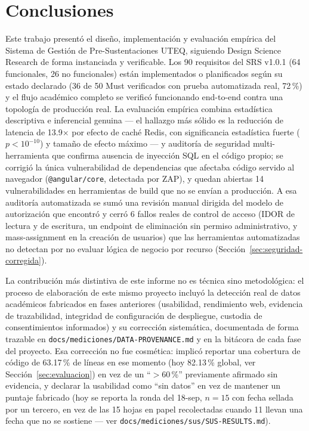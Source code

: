 \section{Conclusiones}
\label{sec:conclusiones}

Este trabajo presentó el diseño, implementación y evaluación empírica del Sistema de Gestión de
Pre-Sustentaciones UTEQ, siguiendo Design Science Research \cite{peffers2007} de forma instanciada y
verificable. Los 90 requisitos del SRS v1.0.1 (64 funcionales, 26 no funcionales) están implementados o planificados
según su estado declarado (36 de 50 Must verificados con prueba automatizada real, 72\,\%) y el flujo
académico completo se verificó funcionando end-to-end contra una topología de producción real. La evaluación empírica combina
estadística descriptiva e inferencial genuina --- el hallazgo más sólido es la reducción de latencia de
13.9$\times$ por efecto de caché Redis, con significancia estadística fuerte ($p < 10^{-10}$) y tamaño
de efecto máximo --- y auditoría de seguridad multi-herramienta que confirma ausencia de inyección SQL en
el código propio; se corrigió la única vulnerabilidad de dependencias que afectaba código servido al
navegador (\texttt{@angular/core}, detectada por ZAP), y quedan abiertas 14 vulnerabilidades en
herramientas de build que no se envían a producción. A esa auditoría automatizada se sumó una revisión
manual dirigida del modelo de autorización que encontró y cerró 6 fallos reales de control de acceso
(IDOR de lectura y de escritura, un endpoint de eliminación sin permiso administrativo, y
mass-assignment en la creación de usuarios) que las herramientas automatizadas no detectan por no
evaluar lógica de negocio por recurso (Sección~\ref{sec:seguridad-corregida}).

La contribución más distintiva de este informe no es técnica sino metodológica: el proceso de
elaboración de este mismo proyecto incluyó la detección real de datos académicos fabricados en fases
anteriores (usabilidad, rendimiento web, evidencia de trazabilidad, integridad de configuración de
despliegue, custodia de consentimientos informados) y su corrección sistemática, documentada de forma
trazable en \texttt{docs/mediciones/DATA-PROVENANCE.md} y en la bitácora de cada fase del proyecto. Esa
corrección no fue cosmética: implicó reportar una cobertura de código de 63.17\,\% de líneas en ese
momento (hoy 82.13\,\% global, ver Sección~\ref{sec:evaluacion}) en vez de un ``$>$60\,\%'' previamente afirmado
sin evidencia, y declarar la usabilidad como ``sin datos'' en vez de mantener un puntaje fabricado (hoy
se reporta la ronda del 18-sep, $n=15$ con fecha sellada por un tercero, en vez de las 15 hojas en papel
recolectadas cuando 11 llevan una fecha que no se sostiene --- ver
\texttt{docs/mediciones/sus/SUS-RESULTS.md}).

